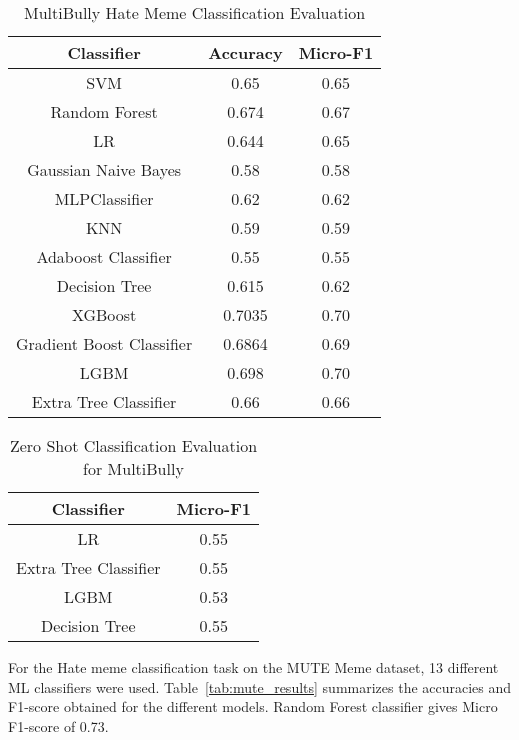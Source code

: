 \documentclass{ieeeaccess}
\begin{document}
\begin{table}[htbp]
\caption{MultiBully Hate Meme Classification Evaluation}
\label{tab:multibully_results}
\centering
\begin{tabular}{|c|c|c|}
\hline
\textbf{Classifier} & \textbf{Accuracy} & \textbf{Micro-F1} \\
\hline
SVM & 0.65 & 0.65 \\
Random Forest & 0.674 & 0.67 \\
LR & 0.644 & 0.65 \\
Gaussian Naive Bayes & 0.58 & 0.58 \\
MLPClassifier & 0.62 & 0.62 \\
KNN & 0.59 & 0.59 \\
Adaboost Classifier & 0.55 & 0.55 \\
Decision Tree & 0.615 & 0.62 \\
XGBoost & 0.7035 & 0.70 \\
Gradient Boost Classifier & 0.6864 & 0.69 \\
LGBM & 0.698 & 0.70 \\
Extra Tree Classifier & 0.66 & 0.66 \\
\hline
\end{tabular}
\end{table}

\begin{table}[htbp]
\caption{Zero Shot Classification Evaluation for MultiBully}
\label{tab:zero_shot_multibully}
\centering
\begin{tabular}{|c|c|}
\hline
\textbf{Classifier} & \textbf{Micro-F1} \\
\hline
LR & 0.55 \\
Extra Tree Classifier & 0.55 \\
LGBM & 0.53 \\
Decision Tree & 0.55 \\
\hline
\end{tabular}
\end{table}

For the Hate meme classification task on the MUTE Meme dataset, 13 different ML classifiers were used. Table~\ref{tab:mute_results} summarizes the accuracies and F1-score obtained for the different models. Random Forest classifier gives Micro F1-score of 0.73.
\end{document}
